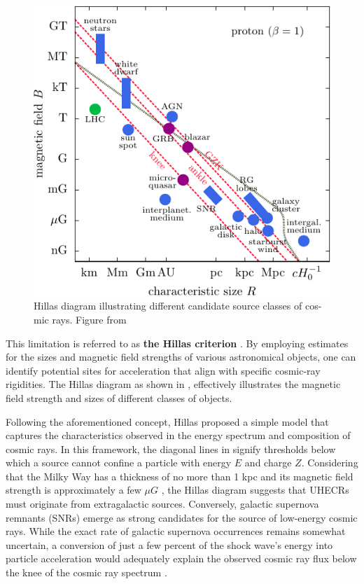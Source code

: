\begin{figure}[h]
    \caption[Hillas diagram]{Hillas diagram illustrating different candidate source classes of cos- mic rays. Figure from \cite{hillas_plot}}
    \includegraphics{./figures/nu_he/Hillas_simple.pdf}
\end{figure}

This limitation is referred to as \textbf{the Hillas criterion} . By employing estimates for the sizes and magnetic field strengths of various astronomical objects, one can identify potential sites for acceleration that align with specific cosmic-ray rigidities. The Hillas diagram as shown in , effectively illustrates the magnetic field strength and sizes of different classes of objects.

Following the aforementioned concept, Hillas proposed a simple model that captures the characteristics observed in the energy spectrum and composition of cosmic rays. In this framework, the diagonal lines in  signify thresholds below which a source cannot confine a particle with energy \(E\) and charge \(Z\). Considering that the Milky Way has a thickness of no more than 1 kpc  and its magnetic field strength is approximately a few $\mu G$ , the Hillas diagram suggests that UHECRs must originate from extragalactic sources. Conversely, galactic supernova remnants (SNRs) emerge as strong candidates for the source of low-energy cosmic rays. While the exact rate of galactic supernova occurrences remains somewhat uncertain, a conversion of just a few percent of the shock wave's energy into particle acceleration would adequately explain the observed cosmic ray flux  below the knee of the cosmic ray spectrum .

